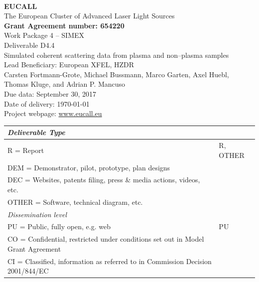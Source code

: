 \documentclass[10pt]{scrartcl}
\begin{document}
\makeatletter
\begin{titlepage}
\thispagestyle{scrheadings}
\begin{center}
$~$\\
\vspace{0cm}
{\Large\textbf{EUCALL}\\[2ex]
The European Cluster of Advanced Laser Light Sources}\\[4ex]
%
{\small\textbf{Grant Agreement number: 654220}}\\[8ex]
%
Work Package 4 -- SIMEX\\[4ex]
%
Deliverable D4.4\\
%
Simulated coherent scattering data from plasma and non--plasma samples\\[5ex]
%
Lead Beneficiary: European XFEL, HZDR\\[5ex]
%
Carsten Fortmann-Grote, Michael Bussmann,
  Marco Garten, Axel Huebl, Thomas Kluge,
  and Adrian P. Mancuso\\[4ex]
%
Due data: September 30, 2017\\
Date of delivery: \today \\[4ex]
%
Project webpage: \url{www.eucall.eu}\\[6ex]
%
{%
\small
\begin{tabular}{|l|l|}
  \hline
  \multicolumn{2}{|l|}{ \textit{Deliverable Type} } \\
  \hline
  R = Report\hfill & R, OTHER \\
  DEM = Demonstrator, pilot, prototype, plan designs & \\
  DEC = Websites, patents filing, press \& media actions, videos, etc. & \\
  OTHER = Software, technical diagram, etc. & \\
  \hline
  \multicolumn{2}{|l|}{\textit{Dissemination level}} \\
  \hline
  PU = Public, fully open, e.g. web & PU \\
  CO = Confidential, restricted under conditions set out in Model Grant
  Agreement\hspace*{17ex}\  & \\
  CI = Classified, information as referred to in Commission Decision 2001/844/EC
  & \\
  \hline
\end{tabular}
}

\end{center}
%
{}
\normalfont
\end{titlepage}
\makeatother
\end{document}
